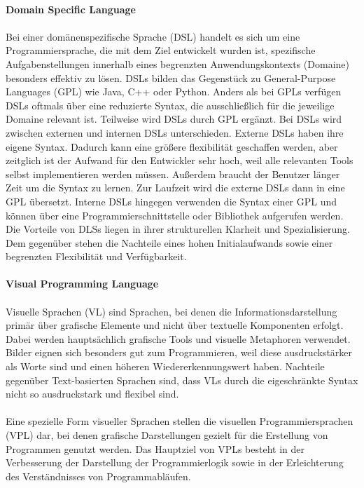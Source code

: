 \documentclass{article}
\begin{document}
    \\
    \textbf{Domain Specific Language}\\
    \\
    Bei einer domänenspezifische Sprache (DSL) handelt es sich um eine Programmiersprache, die mit dem Ziel entwickelt wurden ist, spezifische Aufgabenstellungen innerhalb eines begrenzten Anwendungskontexts (Domaine) besonders effektiv zu lösen. \cite{18}
    DSLs bilden das Gegenstück zu General-Purpose Languages (GPL) wie Java, C++ oder Python. \cite{14}
    Anders als bei GPLs verfügen DSLs oftmals über eine reduzierte Syntax, die ausschließlich für die jeweilige Domaine relevant ist. Teilweise wird DSLs durch GPL ergänzt. \cite{18}
    Bei DSLs wird zwischen externen und internen DSLs unterschieden. Externe DSLs haben ihre eigene Syntax. Dadurch kann eine größere flexibilität geschaffen werden, aber zeitglich ist der Aufwand für den Entwickler sehr hoch, weil alle relevanten Tools selbst implementieren werden müssen. 
    Außerdem braucht der Benutzer länger Zeit um die Syntax zu lernen. \cite{7}
    Zur Laufzeit wird die externe DSLs dann in eine GPL übersetzt. \cite{14}
    Interne DSLs hingegen verwenden die Syntax einer GPL und können über eine Programmierschnittstelle oder Bibliothek aufgerufen werden. \cite{14}
    Die Vorteile von DLSs liegen in ihrer strukturellen Klarheit und Spezialisierung. Dem gegenüber stehen die Nachteile eines hohen Initialaufwands sowie einer begrenzten Flexibilität und Verfügbarkeit. \cite{18}\\ 
    \\
    \textbf{Visual Programming Language}\\
    \\
    Visuelle Sprachen (VL) sind Sprachen, bei denen die Informationsdarstellung primär über grafische Elemente und nicht über textuelle Komponenten erfolgt. \cite{5}
    Dabei werden hauptsächlich grafische Tools und visuelle Metaphoren verwendet. 
    Bilder eignen sich besonders gut zum Programmieren, weil diese ausdruckstärker als Worte sind und einen höheren Wiedererkennungswert haben.
    Nachteile gegenüber Text-basierten Sprachen sind, dass VLs durch die eigeschränkte Syntax nicht so ausdruckstark und flexibel sind. \cite{16}\\
    \\
    Eine spezielle Form visueller Sprachen stellen die visuellen Programmiersprachen (VPL) dar, bei denen grafische Darstellungen gezielt für die Erstellung von Programmen genutzt werden.    
    Das Hauptziel von VPLs besteht in der Verbesserung der Darstellung der Programmierlogik sowie in der Erleichterung des Verständnisses von Programmabläufen. \cite{13}
\end{document}
